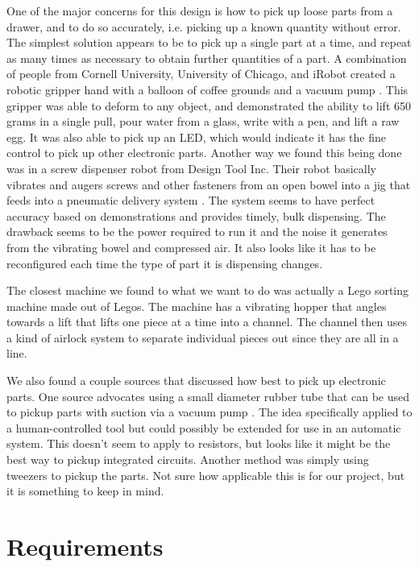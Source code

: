 \documentclass[12pt]{report}
\begin{document}
	
One of the major concerns for this design is how to pick up loose parts from a drawer, and to do so accurately, i.e. picking up a known quantity without error.  The simplest solution appears to be to pick up a single part at a time, and repeat as many times as necessary to obtain further quantities of a part.  A combination of people from Cornell University, University of Chicago, and iRobot created a robotic gripper hand with a balloon of coffee grounds and a vacuum pump \cite{universalGrabber}.  This gripper was able to deform to any object, and demonstrated the ability to lift 650 grams in a single pull, pour water from a glass, write with a pen, and lift a raw egg.  It was also able to pick up an LED, which would indicate it has the fine control to pick up other electronic parts.  Another way we found this being done was in a screw dispenser robot from Design Tool Inc. Their robot basically vibrates and augers screws and other fasteners from an open bowel into a jig that feeds into a pneumatic delivery system \cite{screwDispenser}. The system seems to have perfect accuracy based on demonstrations and provides timely, bulk dispensing. The drawback seems to be the power required to run it and the noise it generates from the vibrating bowel and compressed air. It also looks like it has to be reconfigured each time the type of part it is dispensing changes.


The closest machine we found to what we want to do was actually a Lego sorting machine made out of Legos. The machine has a vibrating hopper that angles towards a lift that lifts one piece at a time into a channel. The channel then uses a kind of airlock system to separate individual pieces out since they are all in a line\cite{legoSorter}.


We also found a couple sources that discussed how best to pick up electronic parts. One source advocates using a small diameter rubber tube that can be used to pickup parts with suction via a vacuum pump \cite{vacuumPick}. The idea specifically applied to a human-controlled tool but could possibly be extended for use in an automatic system. This doesn't seem to apply to resistors, but looks like it might be the best way to pickup integrated circuits. Another method was simply using tweezers to pickup the parts. Not sure how applicable this is for our project, but it is something to keep in mind.

\section*{Requirements}
\end{document}
